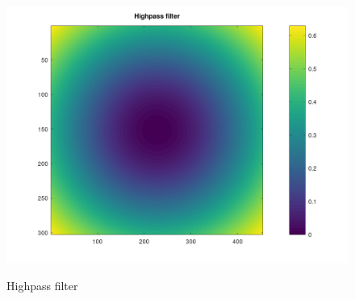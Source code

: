\documentclass{article}
\begin{document}
\begin{figure}[H]
	\begin{center}
		\includegraphics[width=\textwidth]{./images/ex03_2.png}
    \label{ex03_highpass}
		\caption{Highpass filter} 
	\end{center}
\end{figure}
\end{document}

